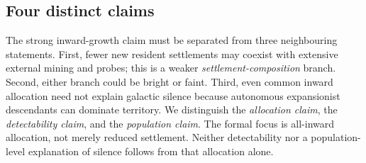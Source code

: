 \subsection{Four distinct claims}

The strong inward-growth claim must be separated from three neighbouring statements. First, fewer new resident settlements may coexist with extensive external mining and probes; this is a weaker \emph{settlement-composition} branch. Second, either branch could be bright or faint. Third, even common inward allocation need not explain galactic silence because autonomous expansionist descendants can dominate territory. We distinguish the \emph{allocation claim}, the \emph{detectability claim}, and the \emph{population claim}. The formal focus is all-inward allocation, not merely reduced settlement. Neither detectability nor a population-level explanation of silence follows from that allocation alone.

